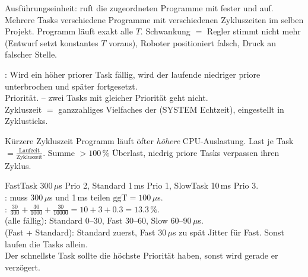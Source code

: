 \label{sec:tasks}

 Ausführungseinheit: ruft die zugeordneten Programme mit fester
 und  auf. Mehrere Tasks \ra verschiedene
Programme mit verschiedenen Zykluszeiten im selben Projekt.
 Programm läuft exakt alle $T$. Schwankung $=$
 \ra Regler stimmt nicht mehr (Entwurf setzt konstantes $T$
voraus), Roboter positioniert falsch, Druck an falscher Stelle.

\begin{formel}
: Wird ein höher priorer Task fällig, wird der laufende
niedriger priore unterbrochen und später fortgesetzt.\\
 Priorität.  -- zwei Tasks mit gleicher Priorität geht nicht.\\
Zykluszeit $=$ ganzzahliges Vielfaches der  (SYSTEM \ra
Echtzeit), eingestellt in Zyklusticks.
\end{formel}
\begin{falle}
Kürzere Zykluszeit \ra Programm läuft öfter \ra \emph{höhere}
CPU-Auslastung. Last je Task $=\frac{\text{Laufzeit}}{\text{Zykluszeit}}$.
Summe $>100\,\%$ \ra Überlast, niedrig priore Tasks verpassen ihren Zyklus.
\end{falle}

\begin{bsp}
\label{bsp:tasks}
FastTask 300\,$\mu$s Prio 2, Standard 1\,ms Prio 1, SlowTask 10\,ms Prio 3.\\
: muss 300\,$\mu$s und 1\,ms teilen \ra $\text{ggT}=100\,\mu$s.\\
: $\frac{30}{300}+\frac{30}{1000}+\frac{30}{10000}=10+3+0.3=13.3\,\%$.\\
 (alle fällig): Standard 0--30, Fast 30--60, Slow 60--90\,$\mu$s.\\
 (Fast + Standard): Standard zuerst, Fast 30\,$\mu$s zu spät
\ra Jitter für Fast. Sonst laufen die Tasks allein.\\
 Der schnellste Task sollte die höchste Priorität haben, sonst
wird gerade er verzögert.
\end{bsp}

